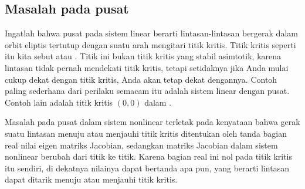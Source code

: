 \subsection{Masalah pada pusat}

Ingatlah bahwa pusat pada sistem linear berarti lintasan-lintasan
bergerak dalam orbit eliptis tertutup
dengan suatu arah mengitari titik kritis. Titik
kritis seperti itu kita sebut \emph{} atau
\emph{}. Titik ini bukan titik kritis yang stabil
asimtotik, karena lintasan tidak pernah mendekati titik kritis,
tetapi setidaknya jika Anda mulai cukup dekat dengan titik kritis,
Anda akan tetap dekat dengannya. Contoh paling sederhana dari
perilaku semacam itu adalah sistem linear dengan pusat. Contoh
lain adalah titik kritis $(0,0)$ dalam
.

Masalah pada pusat dalam sistem nonlinear terletak pada kenyataan bahwa
gerak suatu lintasan menuju atau menjauhi titik kritis ditentukan oleh tanda
bagian real nilai eigen matriks Jacobian, sedangkan matriks Jacobian
dalam sistem nonlinear berubah dari titik ke titik. Karena bagian
real ini nol pada titik kritis itu sendiri, di dekatnya nilainya dapat bertanda apa pun,
yang berarti lintasan dapat ditarik menuju atau menjauhi titik
kritis.

